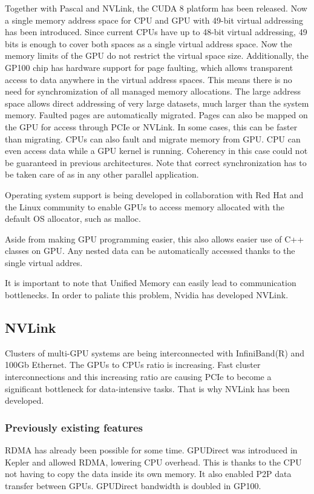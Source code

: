 Together with Pascal and NVLink, the CUDA 8 platform has been released.
Now a single memory address space for CPU and GPU with 49-bit virtual addressing has been introduced.
Since current CPUs have up to 48-bit virtual addressing, 49 bits is enough to cover both spaces as a single virtual address space.
Now the memory limits of the GPU do not restrict the virtual space size.
Additionally, the GP100 chip has hardware support for page faulting, which allows transparent access to data anywhere in the virtual address spaces.
This means there is no need for synchromization of all managed memory allocations.
The large address space allows direct addressing of very large datasets, much larger than the system memory.
Faulted pages are automatically migrated.
Pages can also be mapped on the GPU for access through PCIe or NVLink.
In some cases, this can be faster than migrating.
CPUs can also fault and migrate memory from GPU.
CPU can even access data while a GPU kernel is running.
Coherency in this case could not be guaranteed in previous architectures.
Note that correct synchronization has to be taken care of as in any other parallel application.

Operating system support is being developed in collaboration with Red Hat and the Linux community to enable GPUs to access memory allocated with the default OS allocator, such as malloc.

Aside from making GPU programming easier, this also allows easier use of C++ classes on GPU.
Any nested data can be automatically accessed thanks to the single virtual addres.

It is important to note that Unified Memory can easily lead to communication bottlenecks.
In order to paliate this problem, Nvidia has developed NVLink.

\subsection{NVLink}

Clusters of multi-GPU systems are being interconnected with InfiniBand(R) and 100Gb Ethernet.
The GPUs to CPUs ratio is increasing.
Fast cluster interconnections and this increasing ratio are causing PCIe to become a significant bottleneck for data-intensive tasks.
That is why NVLink has been developed.

\subsubsection{Previously existing features}
RDMA has already been possible for some time.
GPUDirect was introduced in Kepler and allowed RDMA, lowering CPU overhead.
This is thanks to the CPU not having to copy the data inside its own memory.
It also enabled P2P data transfer between GPUs.
GPUDirect bandwidth is doubled in GP100.
